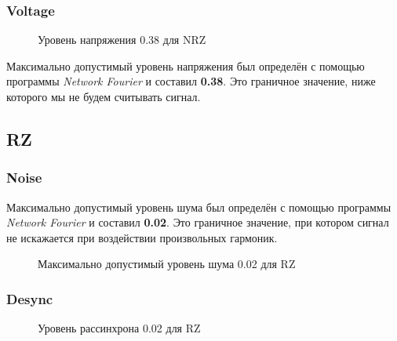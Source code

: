 \subsubsection{Voltage}

\begin{wrapfigure}{l}{0.7\textwidth}
	\centering
	\caption{Уровень напряжения 0.38 для NRZ}
	\vspace{-100pt}
\end{wrapfigure}

Максимально допустимый уровень напряжения был определён с помощью программы \textit{Network Fourier} и составил \textbf{0.38}. Это граничное значение, ниже которого мы не будем считывать сигнал.




\subsection{RZ}

\subsubsection{Noise}

Максимально допустимый уровень шума был определён с помощью программы \textit{Network Fourier} и составил \textbf{0.02}. Это граничное значение, при котором сигнал не искажается при воздействии произвольных гармоник.

\vspace{0.4cm}
\begin{figure}[h]
	\centering
	\caption{Максимально допустимый уровень шума 0.02 для RZ}
\end{figure}

\subsubsection{Desync}

\vspace{-0.2cm}
\begin{wrapfigure}{r}{0.65\textwidth}
	\centering
	\caption{Уровень рассинхрона 0.02 для RZ}
	\vspace{-125pt}
\end{wrapfigure}

